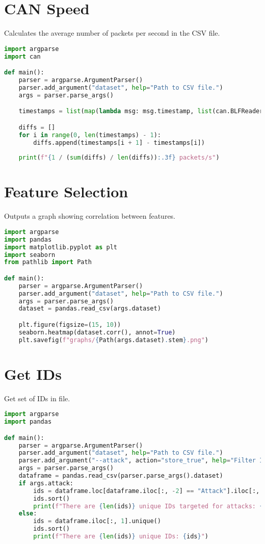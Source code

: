 \section{CAN Speed}

Calculates the average number of packets per second in the CSV file.

\begin{lstlisting}[language=Python]
import argparse
import can

def main():
    parser = argparse.ArgumentParser()
    parser.add_argument("dataset", help="Path to CSV file.")
    args = parser.parse_args()

    timestamps = list(map(lambda msg: msg.timestamp, list(can.BLFReader(args.dataset))))

    diffs = []
    for i in range(0, len(timestamps) - 1):
        diffs.append(timestamps[i + 1] - timestamps[i])
    
    print(f"{1 / (sum(diffs) / len(diffs)):.3f} packets/s")
\end{lstlisting}

\section{Feature Selection}

Outputs a graph showing correlation between features.

\begin{lstlisting}[language=Python]
import argparse
import pandas
import matplotlib.pyplot as plt
import seaborn
from pathlib import Path

def main():
    parser = argparse.ArgumentParser()
    parser.add_argument("dataset", help="Path to CSV file.")
    args = parser.parse_args()
    dataset = pandas.read_csv(args.dataset)

    plt.figure(figsize=(15, 10))
    seaborn.heatmap(dataset.corr(), annot=True)
    plt.savefig(f"graphs/{Path(args.dataset).stem}.png")
\end{lstlisting}

\section{Get IDs}

Get set of IDs in file.

\begin{lstlisting}[language=Python]
import argparse
import pandas

def main():
    parser = argparse.ArgumentParser()
    parser.add_argument("dataset", help="Path to CSV file.")
    parser.add_argument("--attack", action="store_true", help="Filter IDs that are attacked.")
    args = parser.parse_args()
    dataframe = pandas.read_csv(parser.parse_args().dataset)
    if args.attack:
        ids = dataframe.loc[dataframe.iloc[:, -2] == "Attack"].iloc[:, 1].unique()
        ids.sort()
        print(f"There are {len(ids)} unique IDs targeted for attacks: {ids}")
    else:
        ids = dataframe.iloc[:, 1].unique()
        ids.sort()
        print(f"There are {len(ids)} unique IDs: {ids}")
\end{lstlisting}

